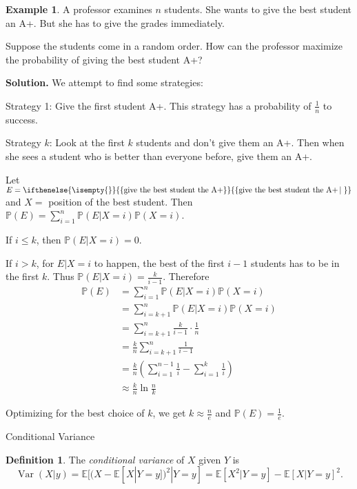 \documentclass[a4paper,11pt]{amsbook}
\makeatletter
\def\section{\@startsection{section}{2}%
    \z@{1\linespacing\@plus1\linespacing}{.5\linespacing}%
    {\large\normalfont\bfseries\centering\color{darkblue}}}
\theoremstyle{definition}
\newtheorem{definition}{\hspace{-2em} \color{darkblue} Definition}[chapter]
\newtheorem{example}{\hspace{-2em} \color{darkblue} Example}[chapter]
\theoremstyle{remark}
\newcommand{\E}{\mathbb{E}}
\renewcommand{\P}{\mathbb{P}}
\DeclareMathOperator\Var{Var}
\newcommand\0{\varnothing}
\newcommand\set[2][]
{
    \ifthenelse{\isempty{#1}}
    {
        \left\{#2\right\}
    }
    {
        \left\{#2\left|\,#1\right.\right\}
    }
}
\makeatother
\begin{document}
\begin{example}
    A professor examines $n$ students. She wants to give the best student an A+.
    But she has to give the grades immediately.

    Suppose the students come in a random order. How can the professor maximize the probability of 
    giving the best student A+?

    \noindent \textbf{Solution.} We attempt to find some strategies:

    Strategy 1: Give the first student A+. This strategy has a probability of $\frac{1}{n}$ to success.

    Strategy $k$: Look at the first $k$ students and don't give them an A+.
    Then when she sees a student who is better than everyone before, give them an A+.

    Let $E=\set{\text{give the best student the A+}}$ and $X=$ position of the best student.
    Then $\P(E)=\sum_{i=1}^n\P(E|X=i)\P(X=i)$.

    If $i\leq k$, then $\P(E|X=i)=0$.

    If $i>k$, for $E|X=i$ to happen, the best of the first $i-1$ students has to be in the first $k$.
    Thus $\P(E|X=i)=\frac{k}{i-1}$. Therefore \begin{align*}
        \P(E)&=\sum_{i=1}^n\P(E|X=i)\P(X=i) \\
        &=\sum_{i=k+1}^n\P(E|X=i)\P(X=i) \\
        &=\sum_{i=k+1}^n\frac{k}{i-1}\cdot\frac{1}{n} \\
        &=\frac{k}{n}\sum_{i=k+1}^n\frac{1}{i-1} \\
        &=\frac{k}{n}\left(\sum_{i=1}^{n-1}\frac{1}{i}-\sum_{i=1}^{k}\frac{1}{i}\right) \\
        &\approx\frac{k}{n}\ln\frac{n}{k}
    \end{align*}

    Optimizing for the best choice of $k$, we get $k\approx\frac{n}{e}$
    and $\P(E)=\frac{1}{e}$.
\end{example}

\section{Conditional Variance} \label{sec::cond_var}

\begin{definition}
    The \emph{conditional variance} of $X$ given $Y$ is $$\Var(X|y)=\E[(X-\E[X|Y=y])^2|Y=y]
    =\E[X^2|Y=y]-\E[X|Y=y]^2.$$
\end{definition}
\end{document}
